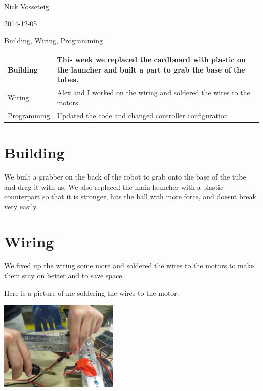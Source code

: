 Nick Vosseteig

2014-12-05

Building, Wiring, Programming

\begin{tabular}{|p{5cm}|p{5cm}|}
 \hline
 Building&
This week we replaced the cardboard with plastic on the launcher and built a part to grab the base of the tubes.
 \\
 \hline
Wiring&
Alex and I worked on the wiring and soldered the wires to the motors.
 \\
 \hline
Programming&
Updated the code and changed controller configuration.
 \\
 \hline
\end{tabular}

\section*{Building}
We built a grabber on the back of the robot to grab onto the base of the tube and drag it with us. We also replaced the main launcher with a plastic counterpart so that it is stronger, hits the ball with more force, and doesnt break very easily.
\section*{Wiring}
We fixed up the wiring some more and soldered the wires to the motors to make them stay on better and to save space.

Here is a picture of me soldering the wires to the motor:
\begin{center}
 \includegraphics[width=215px]{./Entries/Images/nick_soldering.jpg}
\end{center}
